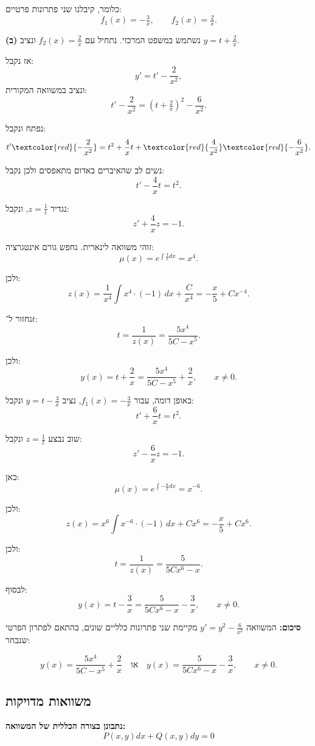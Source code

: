 \documentclass{article}
\numberwithin{equation}{section}
\begin{document}
כלומר, קיבלנו שני פתרונות פרטיים:
\[
f_1(x)=-\tfrac{3}{x}, \qquad f_2(x)=\tfrac{2}{x}.
\]

\textbf{(ב)}  
נשתמש במשפט המרכזי.  
נתחיל עם $f_2(x)=\tfrac{2}{x}$ ונציב $y=t+\tfrac{2}{x}$.  

אז נקבל:
\[
y' = t' - \frac{2}{x^2},
\]
ונציב במשוואה המקורית:
\[
t' - \frac{2}{x^2} = (t+\tfrac{2}{x})^2 - \frac{6}{x^2}.
\]

נפתח ונקבל:
\[
t' \textcolor{red}{- \frac{2}{x^2}} = t^2 + \frac{4}{x}t + \textcolor{red}{\frac{4}{x^2}} \textcolor{red}{- \frac{6}{x^2}}.
\]

נשים לב שהאיברים באדום מתאפסים ולכן נקבל: 
\[
t' - \frac{4}{x}t = t^2.
\]


נגדיר $z=\tfrac{1}{t}$, ונקבל:
\[
z' + \frac{4}{x}z = -1.
\]

זוהי משוואה לינארית.  
נחפש גורם אינטגרציה:
\[
\mu(x) = e^{\int \tfrac{4}{x}dx} = x^4.
\]

ולכן:
\[
z(x) = \frac{1}{x^4}\int x^4\cdot (-1)\,dx + \frac{C}{x^4}
= -\frac{x}{5}+Cx^{-4}.
\]

נחזור ל־$t$:  
\[
t=\frac{1}{z(x)}=\frac{5x^4}{5C-x^5}.
\]

ולכן:
\[
y(x)=t+\frac{2}{x} = \frac{5x^4}{5C-x^5}+\frac{2}{x}, \qquad x\neq 0.
\]

באופן דומה, עבור $f_1(x)=-\tfrac{3}{x}$, נציב $y=t-\tfrac{3}{x}$ ונקבל:
\[
t' + \frac{6}{x}t = t^2.
\]

שוב נבצע $z=\tfrac{1}{t}$ ונקבל:
\[
z' - \frac{6}{x}z = -1.
\]

כאן:
\[
\mu(x)=e^{\int -\tfrac{6}{x}dx}=x^{-6}.
\]

ולכן:
\[
z(x) = x^6\int x^{-6}\cdot (-1)\,dx + Cx^6
= -\frac{x}{5}+Cx^6.
\]

ולכן:
\[
t=\frac{1}{z(x)}=\frac{5}{5Cx^6-x}.
\]

לבסוף:
\[
y(x)=t-\frac{3}{x} = \frac{5}{5Cx^6-x}-\frac{3}{x}, \qquad x\neq 0.
\]

\textbf{סיכום:}  
המשוואה $y'=y^2-\tfrac{6}{x^2}$ מקיימת שני פתרונות כלליים שונים, בהתאם לפתרון הפרטי שנבחר:  

\[
\boxed{y(x)=\frac{5x^4}{5C-x^5}+\frac{2}{x}}
\quad \text{או} \quad
\boxed{y(x)=\frac{5}{5Cx^6-x}-\frac{3}{x}}, \qquad x\neq 0.
\]

\newpage
\subsection{משוואות מדויקות}

\textbf{נתבונן בצורה הכללית של המשוואה:}
\begin{equation}\label{exact}
P(x,y)dx + Q(x,y)dy = 0
\end{equation}
\end{document}
